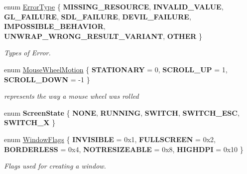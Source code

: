 \begin{DoxyCompactItemize}
\item 
\mbox{\label{namespacenta_a1ddeff35318678e360dfa44ca9577b16}} 
enum \hyperlink{namespacenta_a1ddeff35318678e360dfa44ca9577b16}{Error\+Type} \{ \newline
{\bfseries M\+I\+S\+S\+I\+N\+G\+\_\+\+R\+E\+S\+O\+U\+R\+CE}, 
{\bfseries I\+N\+V\+A\+L\+I\+D\+\_\+\+V\+A\+L\+UE}, 
{\bfseries G\+L\+\_\+\+F\+A\+I\+L\+U\+RE}, 
{\bfseries S\+D\+L\+\_\+\+F\+A\+I\+L\+U\+RE}, 
\newline
{\bfseries D\+E\+V\+I\+L\+\_\+\+F\+A\+I\+L\+U\+RE}, 
{\bfseries I\+M\+P\+O\+S\+S\+I\+B\+L\+E\+\_\+\+B\+E\+H\+A\+V\+I\+OR}, 
{\bfseries U\+N\+W\+R\+A\+P\+\_\+\+W\+R\+O\+N\+G\+\_\+\+R\+E\+S\+U\+L\+T\+\_\+\+V\+A\+R\+I\+A\+NT}, 
{\bfseries O\+T\+H\+ER}
 \}\begin{DoxyCompactList}\small\item\em Types of Error. \end{DoxyCompactList}
\item 
\mbox{\label{namespacenta_aabafd53ba7264997db9e6e934a8ade2b}} 
enum \hyperlink{namespacenta_aabafd53ba7264997db9e6e934a8ade2b}{Mouse\+Wheel\+Motion} \{ {\bfseries S\+T\+A\+T\+I\+O\+N\+A\+RY} = 0, 
{\bfseries S\+C\+R\+O\+L\+L\+\_\+\+UP} = 1, 
{\bfseries S\+C\+R\+O\+L\+L\+\_\+\+D\+O\+WN} = -\/1
 \}\begin{DoxyCompactList}\small\item\em represents the way a mouse wheel was rolled \end{DoxyCompactList}
\item 
\mbox{\label{namespacenta_a784064b76630398da451dbeffdfc5ad2}} 
enum {\bfseries Screen\+State} \{ \newline
{\bfseries N\+O\+NE}, 
{\bfseries R\+U\+N\+N\+I\+NG}, 
{\bfseries S\+W\+I\+T\+CH}, 
{\bfseries S\+W\+I\+T\+C\+H\+\_\+\+E\+SC}, 
\newline
{\bfseries S\+W\+I\+T\+C\+H\+\_\+X}
 \}
\item 
\mbox{\label{namespacenta_a49cf148a7560d323486d7947b79a43b8}} 
enum \hyperlink{namespacenta_a49cf148a7560d323486d7947b79a43b8}{Window\+Flags} \{ \newline
{\bfseries I\+N\+V\+I\+S\+I\+B\+LE} = 0x1, 
{\bfseries F\+U\+L\+L\+S\+C\+R\+E\+EN} = 0x2, 
{\bfseries B\+O\+R\+D\+E\+R\+L\+E\+SS} = 0x4, 
{\bfseries N\+O\+T\+R\+E\+S\+I\+Z\+E\+A\+B\+LE} = 0x8, 
\newline
{\bfseries H\+I\+G\+H\+D\+PI} = 0x10
 \}\begin{DoxyCompactList}\small\item\em Flags used for creating a window. \end{DoxyCompactList}
\end{DoxyCompactItemize}
